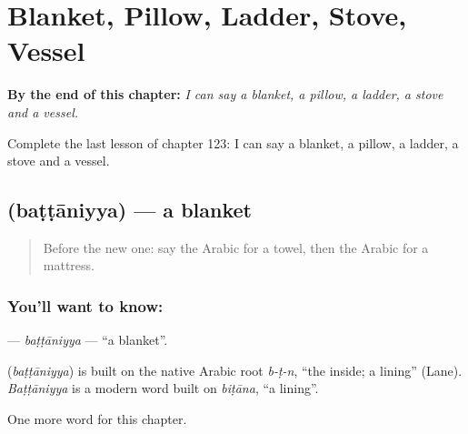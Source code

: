 
\chapter{Blanket, Pillow, Ladder, Stove, Vessel}
\label{ch:ar-blanket-pillow-ladder-stove-vessel}

\begin{chapteropening}
\textbf{By the end of this chapter:} \emph{I can say a blanket, a pillow, a ladder, a stove and a vessel.}

Complete the last lesson of chapter 123: I can say a blanket, a pillow, a ladder, a stove and a vessel.
\end{chapteropening}

\section[\texorpdfstring{\ar{بطانية} (baṭṭāniyya)}{بطانية (baṭṭāniyya)}]{ (baṭṭāniyya) — a blanket}

\label{lesson:AR-C123-battaniyya}



\begin{quote}
Before the new one: say the Arabic for a towel, then the Arabic for a mattress.
\end{quote}

\subsection*{You'll want to know: }
\textbf{} — \emph{baṭṭāniyya} — \textquotedblleft{}a blanket\textquotedblright{}.

\begin{cousinweb}
\textbf{} (\emph{baṭṭāniyya}) is built on the native Arabic root \emph{b-ṭ-n}, \textquotedblleft{}the inside; a lining\textquotedblright{} (Lane). \emph{Baṭṭāniyya} is a modern word built on \emph{biṭāna}, \textquotedblleft{}a lining\textquotedblright{}.
\end{cousinweb}

\begin{grammarlens}[title={What you've built}]
One more word for this chapter.
\end{grammarlens}

